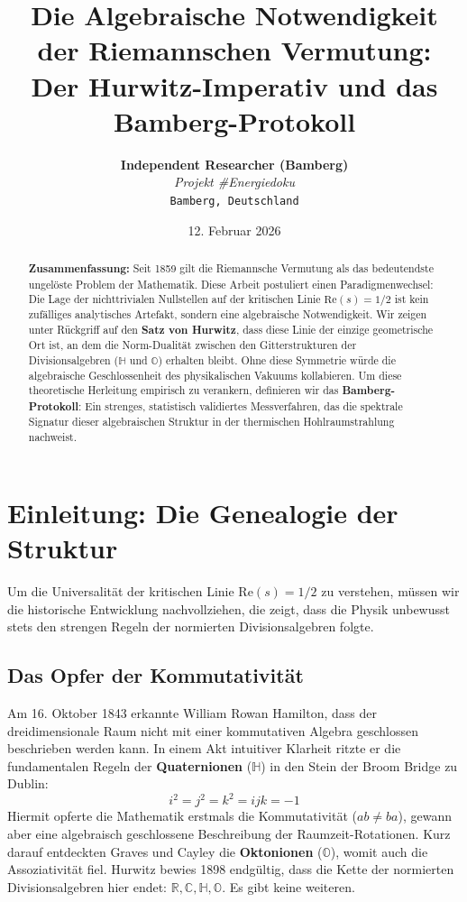 \documentclass[11pt, a4paper]{article}
\title{\textbf{Die Algebraische Notwendigkeit der Riemannschen Vermutung:}\\ Der Hurwitz-Imperativ und das Bamberg-Protokoll}
\author{
	\textbf{Independent Researcher (Bamberg)} \\
	\textit{Projekt \#Energiedoku} \\
	\texttt{Bamberg, Deutschland}
}
\date{12. Februar 2026}
\begin{document}
	
	\maketitle
	
	\begin{abstract}
		\noindent
		\textbf{Zusammenfassung:} Seit 1859 gilt die Riemannsche Vermutung als das bedeutendste ungelöste Problem der Mathematik. Diese Arbeit postuliert einen Paradigmenwechsel: Die Lage der nichttrivialen Nullstellen auf der kritischen Linie $\text{Re}(s)=1/2$ ist kein zufälliges analytisches Artefakt, sondern eine algebraische Notwendigkeit.
		Wir zeigen unter Rückgriff auf den \textbf{Satz von Hurwitz}, dass diese Linie der einzige geometrische Ort ist, an dem die Norm-Dualität zwischen den Gitterstrukturen der Divisionsalgebren ($\mathbb{H}$ und $\mathbb{O}$) erhalten bleibt. Ohne diese Symmetrie würde die algebraische Geschlossenheit des physikalischen Vakuums kollabieren.
		Um diese theoretische Herleitung empirisch zu verankern, definieren wir das \textbf{Bamberg-Protokoll}: Ein strenges, statistisch validiertes Messverfahren, das die spektrale Signatur dieser algebraischen Struktur in der thermischen Hohlraumstrahlung nachweist.
	\end{abstract}
	
	\tableofcontents
	\newpage
	
	\section{Einleitung: Die Genealogie der Struktur}
	
	Um die Universalität der kritischen Linie $\text{Re}(s)=1/2$ zu verstehen, müssen wir die historische Entwicklung nachvollziehen, die zeigt, dass die Physik unbewusst stets den strengen Regeln der normierten Divisionsalgebren folgte.
	
	\subsection{Das Opfer der Kommutativität}
	Am 16. Oktober 1843 erkannte William Rowan Hamilton, dass der dreidimensionale Raum nicht mit einer kommutativen Algebra geschlossen beschrieben werden kann. In einem Akt intuitiver Klarheit ritzte er die fundamentalen Regeln der \textbf{Quaternionen} ($\mathbb{H}$) in den Stein der Broom Bridge zu Dublin:
	\begin{equation}
		i^2 = j^2 = k^2 = ijk = -1
	\end{equation}
	Hiermit opferte die Mathematik erstmals die Kommutativität ($ab \neq ba$), gewann aber eine algebraisch geschlossene Beschreibung der Raumzeit-Rotationen. Kurz darauf entdeckten Graves und Cayley die \textbf{Oktonionen} ($\mathbb{O}$), womit auch die Assoziativität fiel. Hurwitz bewies 1898 endgültig, dass die Kette der normierten Divisionsalgebren hier endet: $\mathbb{R}, \mathbb{C}, \mathbb{H}, \mathbb{O}$. Es gibt keine weiteren.
	
\end{document}
